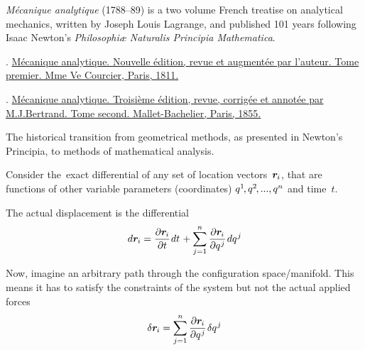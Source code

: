 
\label{section:virtualworkprinciple.genericmechanics}

\emph{Mécanique analytique} (1788--89) is a two volume French treatise on analytical mechanics, written by Joseph Louis Lagrange, and published 101 years following Isaac Newton’s \emph{Philosophiæ Naturalis Principia Mathematica}.

.
\href{https://play.google.com/books/reader?id=Q8MKAAAAYAAJ&pg=GBS.PP7}{Mécanique analytique. Nouvelle édition, revue et augmentée par l’auteur. Tome premier. Mme Ve Courcier, Paris, 1811.} 

.
\href{https://play.google.com/books/reader?id=TmMSAAAAIAAJ&pg=GBS.PP9}{Mécanique analytique. Troisième édition, revue, corrigée et annotée par M.\:J.\:Bertrand. Tome second. Mallet-Bachelier, Paris, 1855.} 

The historical transition from geometrical methods, as presented in Newton’s Principia, to methods of mathematical analysis.

{\small
\setlength{\abovedisplayskip}{2pt}\setlength{\belowdisplayskip}{2pt}

Consider the~exact differential of any set of location vectors~${\bm{r}_{\hspace{-0.1ex}i}}$, that are functions of other variable parameters (coordinates) ${q^{1} \hspace{-0.25ex}, q^{2} \hspace{-0.25ex}, ..., q^{n}}$ and time~$t$.

The actual displacement is the differential
\[
\displaystyle d\bm{r}_{\hspace{-0.1ex}i} = \frac{\partial \bm{r}_{\hspace{-0.1ex}i}}{\partial t} \hspace{.16ex} dt \hspace{.2ex} + \sum_{j=1}^{n} {\frac{\partial \bm{r}_{\hspace{-0.1ex}i}}{\partial q^{\hspace{.1ex}j}}} \hspace{.2ex} dq^{\hspace{.1ex}j}
\]

Now, imagine an arbitrary path through the configuration space/manifold. This means it has to satisfy the constraints of the system but not the actual applied forces
\[
\delta \bm{r}_{\hspace{-0.1ex}i} = \displaystyle\sum_{j=1}^{n} {\displaystyle\frac {\partial \bm{r}_{\hspace{-0.1ex}i}}{\partial q^{\hspace{.1ex}j}}} \hspace{.2ex} \delta q^{\hspace{.1ex}j}
\]

\par}

